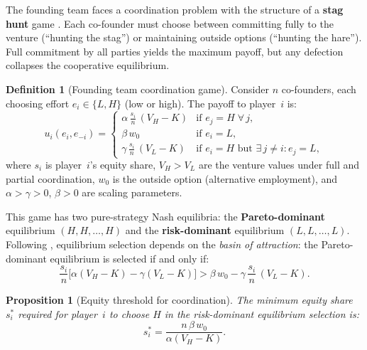 \documentclass[12pt,a4paper,oneside]{book}
\newtheorem{proposition}[theorem]{Proposition}
\theoremstyle{definition}
\newtheorem{definition}[theorem]{Definition}
\theoremstyle{remark}
\begin{document}
The founding team faces a coordination problem with the structure of a
\textbf{stag hunt} game \citep{Skyrms2004}. Each co-founder must choose
between committing fully to the venture (``hunting the stag'') or
maintaining outside options (``hunting the hare''). Full commitment by all
parties yields the maximum payoff, but any defection collapses the
cooperative equilibrium.

\begin{definition}[Founding team coordination game]
Consider $n$ co-founders, each choosing effort $e_i \in \{L, H\}$ (low or
high). The payoff to player~$i$ is:
\begin{equation}\label{eq:stag_hunt}
  u_i(e_i, e_{-i}) =
  \begin{cases}
    \alpha\,\frac{s_i}{n}\,(V_H - K) & \text{if } e_j = H
      \;\forall\, j, \\[4pt]
    \beta\,w_0 & \text{if } e_i = L, \\[4pt]
    \gamma\,\frac{s_i}{n}\,(V_L - K) & \text{if } e_i = H \text{ but }
      \exists\, j \neq i: e_j = L,
  \end{cases}
\end{equation}
where $s_i$ is player~$i$'s equity share, $V_H > V_L$ are the venture
values under full and partial coordination, $w_0$ is the outside option
(alternative employment), and $\alpha > \gamma > 0$, $\beta > 0$ are
scaling parameters.
\end{definition}

This game has two pure-strategy Nash equilibria: the \textbf{Pareto-dominant}
equilibrium $(H, H, \ldots, H)$ and the \textbf{risk-dominant} equilibrium
$(L, L, \ldots, L)$. Following \citet{Skyrms2004}, equilibrium selection
depends on the \emph{basin of attraction}: the Pareto-dominant equilibrium
is selected if and only if:
\begin{equation}\label{eq:basin}
  \frac{s_i}{n}\bigl[\alpha(V_H - K) - \gamma(V_L - K)\bigr]
  > \beta\,w_0 - \gamma\,\frac{s_i}{n}\,(V_L - K).
\end{equation}

\begin{proposition}[Equity threshold for coordination]\label{prop:equity_threshold}
The minimum equity share $s_i^*$ required for player~$i$ to choose $H$ in
the risk-dominant equilibrium selection is:
\begin{equation}\label{eq:s_star}
  s_i^* = \frac{n\,\beta\,w_0}{\alpha(V_H - K)}.
\end{equation}
\end{proposition}
\end{document}
